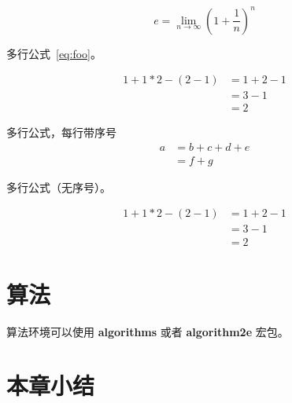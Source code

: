 \begin{equation}
    e = \lim_{n\to \infty} \left(1 + \frac{1}{n}\right)^n
\end{equation}

多行公式~\ref{eq:foo}。

\begin{equation}
    \begin{aligned}
        1+ 1*2 - (2-1) & = 1+ 2 - 1 \\
                       & = 3-1      \\
                       & = 2
    \end{aligned}
    \label{eq:foo}
\end{equation}

多行公式，每行带序号
\begin{align}
  a & = b + c + d + e \\
    & = f + g
\end{align}


多行公式（无序号）。

\begin{equation*}
    \begin{aligned}
        1+ 1*2 - (2-1) & = 1+ 2 - 1 \\
                       & = 3-1      \\
                       & = 2
    \end{aligned}
\end{equation*}



\section{算法}

算法环境可以使用 \textbf{algorithms} 或者  \textbf{algorithm2e} 宏包。

\renewcommand{\algorithmicrequire}{\textbf{输入：}\unskip}
\renewcommand{\algorithmicensure}{\textbf{输出：}\unskip}



\section{本章小结}

